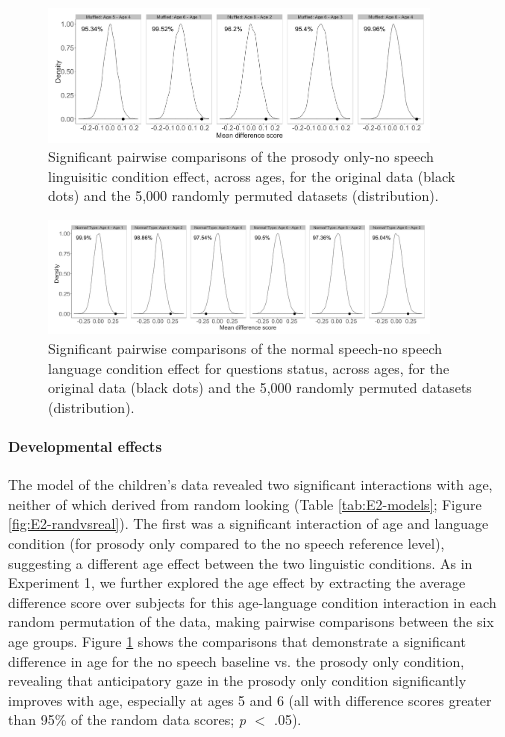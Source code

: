 \documentclass[authoryear, 12pt]{elsarticle}
\begin{document}
\begin{figure}[h!]
\begin{center}
\includegraphics[width=0.9\textwidth]{figures/E2-child-randvsreal-ttest-muffledages.png}
\end{center}
\caption{Significant pairwise comparisons of the prosody only-no speech linguisitic condition effect, across ages, for the original data (black dots) and the 5,000 randomly permuted datasets (distribution).} 
\label{fig:E2-lgageinteraction}
\end{figure}

\begin{figure}[h!]
\begin{center}
\includegraphics[width=0.9\textwidth]{figures/E2-child-randvsreal-ttest-normaltypesages.png}
\end{center}
\caption{Significant pairwise comparisons of the normal speech-no speech language condition effect for questions status, across ages, for the original data (black dots) and the 5,000 randomly permuted datasets (distribution).} 
\label{fig:E2-lgagetypeinteraction}
\end{figure}

\paragraph{Developmental effects}
The model of the children's data revealed two significant interactions with age, neither of which derived from random looking (Table \ref{tab:E2-models}; Figure \ref{fig:E2-randvsreal}). The first was a significant interaction of age and language condition (for prosody only compared to the no speech reference level), suggesting a different age effect between the two linguistic conditions. As in Experiment 1, we further explored the age effect by extracting the average difference score over subjects for this age-language condition interaction in each random permutation of the data, making pairwise comparisons between the six age groups. Figure \ref{fig:E2-lgageinteraction} shows the comparisons that demonstrate a significant difference in age for the no speech baseline vs. the prosody only condition, revealing that anticipatory gaze in the prosody only condition significantly improves with age, especially at ages 5 and 6 (all with difference scores greater than 95\% of the random data scores; \textit{p} $<$ .05).
\end{document}
